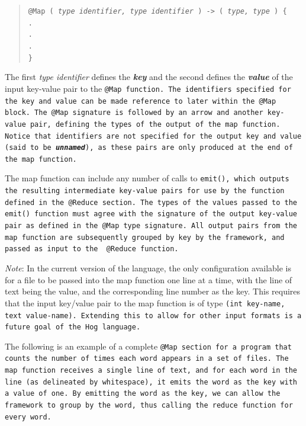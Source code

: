 \documentclass{book}
\begin{document}
\begin{quotation} \tt @Map ( \rm \emph{type identifier, type identifier} \tt )
-> ( \rm \emph{type, type} \tt ) \{ \\ \indent \indent . \\ \indent \indent .
\\ \indent \indent . \\ \indent \tt \} \rm \end{quotation}

The first \emph{type identifier} defines the \emph{\textbf{key}} and the second
defines the \emph{\textbf{value}} of the input key-value pair to the \tt @Map
\rm function. The identifiers specified for the key and value can be made
reference to later within the \tt @Map \rm block. The \tt @Map \rm signature is
followed by an arrow and another key-value pair, defining the types of the
output of the map function. Notice that identifiers are not specified for the
output key and value (said to be \emph{\textbf{unnamed}}), as these pairs are
only produced at the end of the map function. 

The map function can include any number of calls to \tt emit()\rm, which outputs
the resulting intermediate key-value pairs for use by the function defined in the
\tt @Reduce \rm section. The types of the values passed to the \tt emit() \rm
function must agree with the signature of the output key-value pair as defined in
the \tt @Map \rm type signature. All output pairs from the map function are
subsequently grouped by key by the framework, and passed as input to the \tt
@Reduce \rm function.

\emph{Note}: In the current version of the language, the only configuration
available is for a file to be passed into the map function one line at a time,
with the line of text being the value, and the corresponding line number as the
key. This requires that the input key/value pair to the map function is of type
\tt (int key‐name, text value‐name)\rm. Extending this to allow for other input
formats is a future goal of the Hog language.

The following is an example of a complete \tt @Map \rm section for a program that
counts the number of times each word appears in a set of files. The map function
receives a single line of text, and for each word in the line (as delineated by
whitespace), it emits the word as the key with a value of one. By emitting the word
as the key, we can allow the framework to group by the word, thus calling the
reduce function for every word.
\end{document}

